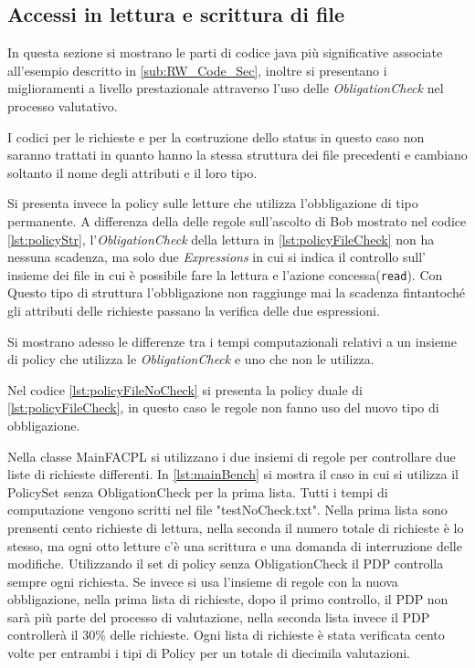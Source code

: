 \subsection{Accessi in lettura e scrittura di file}
\label{sub:EsAccesJava}
In questa sezione si mostrano le parti di codice java più significative associate all'esempio descritto in \ref{sub:RW_Code_Sec},
inoltre si presentano i miglioramenti a livello prestazionale attraverso l'uso delle \emph{ObligationCheck}
nel processo valutativo.\par
\vspace{2mm}
I codici per le richieste e per la costruzione dello status in questo caso non saranno trattati
in quanto hanno la stessa struttura dei file precedenti e cambiano soltanto il nome degli attributi e il loro tipo.\par
Si presenta invece la policy sulle letture che utilizza l'obbligazione di tipo permanente. A differenza della
delle regole sull'ascolto di Bob mostrato nel codice \ref{lst:policyStr}, l'\emph{ObligationCheck} della lettura in
\ref{lst:policyFileCheck} non ha nessuna scadenza, ma solo due \emph{Expressions} in cui si indica il controllo sull'
insieme dei file in cui è possibile fare la lettura e l'azione concessa(\texttt{read}). Con Questo tipo di struttura
l'obbligazione non raggiunge mai la scadenza fintantoché gli attributi delle richieste passano la verifica delle due espressioni.

Si mostrano adesso le differenze tra i tempi computazionali relativi a un insieme di policy che utilizza le \emph{ObligationCheck}
e uno che non le utilizza.\par
Nel codice \ref{lst:policyFileNoCheck} si presenta la policy duale di \ref{lst:policyFileCheck},
in questo caso le regole non fanno uso del nuovo tipo di obbligazione.

Nella classe MainFACPL si utilizzano i due insiemi di regole per controllare due liste di richieste differenti.
In \ref{lst:mainBench} si mostra il caso in cui si utilizza il PolicySet senza ObligationCheck per la prima lista.
Tutti i tempi di computazione vengono scritti nel file "testNoCheck.txt".
Nella prima lista sono prensenti cento richieste di lettura, nella seconda il numero totale di richieste è lo stesso,
ma ogni otto letture c'è una scrittura e una domanda di interruzione delle modifiche.
Utilizzando il set di policy senza ObligationCheck il PDP controlla sempre ogni richiesta. Se invece si usa l'insieme di regole
con la nuova obbligazione, nella prima lista di richieste, dopo il primo controllo, il PDP non sarà più parte del processo
di valutazione, nella seconda lista invece il PDP controllerà il 30\% delle richieste.
Ogni lista di richieste è stata verificata cento volte per entrambi i tipi di Policy per un totale di diecimila valutazioni.


